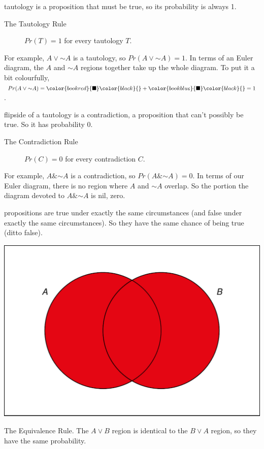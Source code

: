 \documentclass[justified]{tufte-book}
\renewcommand{\neg}{\mathbin{\sim}}
\renewcommand{\wedge}{\mathbin{\&}}
\newcommand{\p}{Pr}
\theoremstyle{definition}
\theoremstyle{definition}
\theoremstyle{definition}
\theoremstyle{remark}
\begin{document}
 tautology is a proposition that must be true, so its probability is always 1.

\begin{description}
\item[The Tautology Rule]
\(\p(T) = 1\) for every tautology \(T\).
\end{description}

For example, \(A \vee \neg A\) is a tautology, so \(\p(A \vee \neg A) = 1\). In terms of an Euler diagram, the \(A\) and \(\neg A\) regions together take up the whole diagram. To put it a bit colourfully, \(\p(A \vee \neg A) = \color{bookred}{\blacksquare}\color{black}{} + \color{bookblue}{\blacksquare}\color{black}{} = 1\).

 flipside of a tautology is a contradiction, a proposition that can't possibly be true. So it has probability 0.

\begin{description}
\item[The Contradiction Rule]
\(\p(C) = 0\) for every contradiction \(C\).
\end{description}

For example, \(A \wedge \neg A\) is a contradiction, so \(\p(A \wedge \neg A) = 0\). In terms of our Euler diagram, there is no region where \(A\) and \(\neg A\) overlap. So the portion the diagram devoted to \(A \wedge \neg A\) is nil, zero.

 propositions are true under exactly the same circumstances (and false under exactly the same circumstances). So they have the same chance of being true (ditto false).

\begin{marginfigure}
\includegraphics{_main_files/figure-latex/unnamed-chunk-57-1} \caption[The Equivalence Rule]{The Equivalence Rule. The $A \vee B$ region is identical to the $B \vee A$ region, so they have the same probability.}\label{fig:unnamed-chunk-57}
\end{marginfigure}
\end{document}
